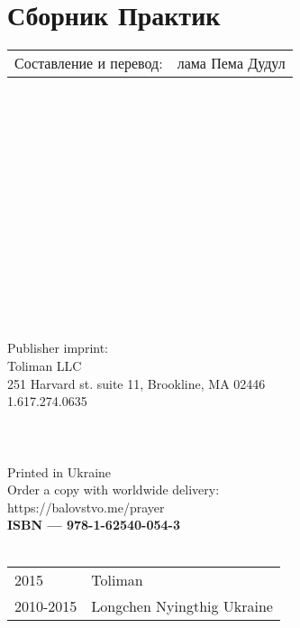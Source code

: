 \section*{Сборник Практик}

\begin{tabular}{ll}
Составление и перевод: & лама Пема Дудул
\end{tabular}
\\
\\
\\
\\
\\
\\
\\
\\
\\
\\
\\
\\
\\
\\
Publisher imprint: \\
Toliman LLC \\
251 Harvard st. suite 11, Brookline, MA 02446 \\
1.617.274.0635 \\
\\
\\
\\
Printed in Ukraine \\

Order a copy with worldwide delivery: \\
https://balovstvo.me/prayer \\

{\bf  ISBN — 978-1-62540-054-3 \hspace{2em}} \\ \\

\begin{tabular}{ll}
\textcopyright{} 2015 & Toliman \\
\textcopyright{} 2010-2015 & Longchen Nyingthig Ukraine
\end{tabular}
